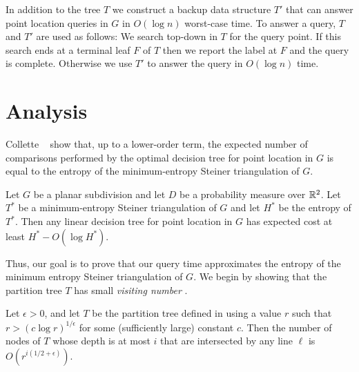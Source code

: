 \documentclass{patmorin}
\begin{document}
In addition to the tree $T$ we construct a backup data structure $T'$ that
can answer point location queries in $G$ in $O(\log n)$ worst-case time.
To answer a query, $T$ and $T'$ are used as follows:  We search top-down
in $T$ for the query point. If this search ends at a terminal leaf
$F$ of $T$ then we report the label at $F$ and the query is complete.
Otherwise we use $T'$ to answer the query in $O(\log n)$ time.

\section{Analysis}

Collette \etal\ \cite{cdilm08,cdilm09} show that, up to a lower-order
term, the expected number of comparisons performed by the optimal
decision tree for point location in $G$ is equal to the entropy of the
minimum-entropy Steiner triangulation of $G$.

\begin{thm}
Let $G$ be a planar subdivision and let $D$ be a probability measure
over $\mathbb{R}^2$.  Let $T^*$ be a  minimum-entropy Steiner triangulation of
$G$ and let $H^*$ be the entropy of $T^*$.  Then any linear decision tree
for point location in $G$ has expected cost at least $H^*-O(\log H^*)$.
\end{thm}

Thus, our goal is to prove that our query time approximates the entropy
of the minimum entropy Steiner triangulation of $G$.  We begin by showing
that the partition tree $T$ has small \emph{visiting number} \cite{hw87}.

\begin{lem}
  Let $\epsilon > 0$, and let $T$ be the partition tree defined
  in  using a value $r$ such that $r>(c\log
  r)^{1/\epsilon}$ for some (sufficiently large) constant $c$.  Then the
  number of nodes of $T$ whose depth is at most $i$ that are intersected
  by any line $\ell$ is $O(r^{i(1/2+\epsilon)})$.
\end{lem}
\end{document}

